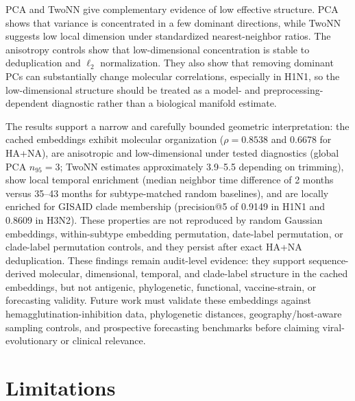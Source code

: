 \documentclass[11pt]{article}
\begin{document}
PCA and TwoNN give complementary evidence of low effective structure. PCA shows that variance is concentrated in a few dominant directions, while TwoNN suggests low local dimension under standardized nearest-neighbor ratios. The anisotropy controls show that low-dimensional concentration is stable to deduplication and $\ell_2$ normalization. They also show that removing dominant PCs can substantially change molecular correlations, especially in H1N1, so the low-dimensional structure should be treated as a model- and preprocessing-dependent diagnostic rather than a biological manifold estimate.

The results support a narrow and carefully bounded geometric interpretation: the cached embeddings exhibit molecular organization ($\rho=0.8538$ and 0.6678 for HA+NA), are anisotropic and low-dimensional under tested diagnostics (global PCA $n_{95}=3$; TwoNN estimates approximately 3.9--5.5 depending on trimming), show local temporal enrichment (median neighbor time difference of 2 months versus 35--43 months for subtype-matched random baselines), and are locally enriched for GISAID clade membership (precision@5 of 0.9149 in H1N1 and 0.8609 in H3N2). These properties are not reproduced by random Gaussian embeddings, within-subtype embedding permutation, date-label permutation, or clade-label permutation controls, and they persist after exact HA+NA deduplication. These findings remain audit-level evidence: they support sequence-derived molecular, dimensional, temporal, and clade-label structure in the cached embeddings, but not antigenic, phylogenetic, functional, vaccine-strain, or forecasting validity. Future work must validate these embeddings against hemagglutination-inhibition data, phylogenetic distances, geography/host-aware sampling controls, and prospective forecasting benchmarks before claiming viral-evolutionary or clinical relevance.

\section{Limitations}
\end{document}
